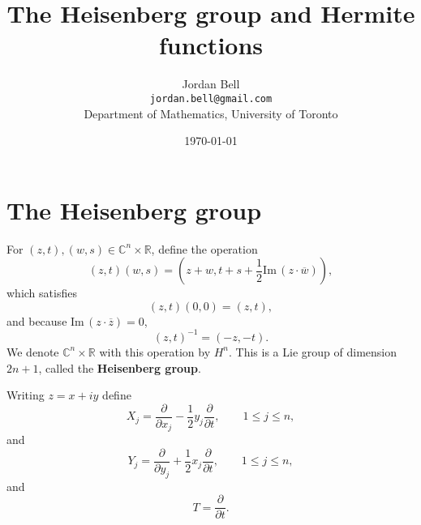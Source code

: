 \documentclass{article}
\def\Im{\ensuremath{\mathrm{Im}}\,}
\theoremstyle{definition}
\begin{document}
\title{The Heisenberg group and Hermite functions}
\author{Jordan Bell\\ \texttt{jordan.bell@gmail.com}\\Department of Mathematics, University of Toronto}
\date{\today}

\maketitle


\section{The Heisenberg group}
For $(z,t),(w,s) \in \mathbb{C}^n \times \mathbb{R}$, define the operation
\[
(z,t)(w,s) = \left(z+w,t+s+\frac{1}{2} \Im(z \cdot \overline{w})\right),
\]
which satisfies
\[
(z,t)(0,0) = (z,t),
\]
and because $\Im(z \cdot \overline{z})=0$,
\[
(z,t)^{-1}=(-z,-t).
\]
We denote $\mathbb{C}^n \times\mathbb{R}$ with this operation by $H^n$. This is a Lie group of dimension $2n+1$, 
called the \textbf{Heisenberg group}.

Writing $z=x+iy$ define
\[
X_j = \frac{\partial}{\partial x_j} - \frac{1}{2}y_j \frac{\partial}{\partial t},\qquad 1 \leq j \leq n,
\]
and
\[
Y_j = \frac{\partial}{\partial y_j} + \frac{1}{2}x_j \frac{\partial}{\partial t},\qquad 1 \leq j \leq n,
\]
and
\[
T = \frac{\partial}{\partial t}.
\]
\end{document}
